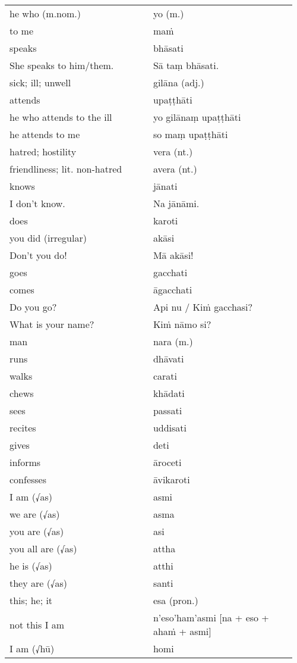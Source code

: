 \documentclass[a5paper]{memoir}
\begin{document}
\begin{longtable}{L{0.48\linewidth} L{0.48\linewidth}}
he who (m.nom.) & yo (m.)\\[0pt]
to me & maṁ\\[0pt]
speaks & bhāsati\\[0pt]
She speaks to him/them. & Sā taṃ bhāsati.\\[0pt]
sick; ill; unwell & gilāna (adj.)\\[0pt]
attends & upaṭṭhāti\\[0pt]
he who attends to the ill & yo gilānaṃ upaṭṭhāti\\[0pt]
he attends to me & so maṃ upaṭṭhāti\\[0pt]
hatred; hostility & vera (nt.)\\[0pt]
friendliness; lit. non-hatred & avera (nt.)\\[0pt]
knows & jānati\\[0pt]
I don't know. & Na jānāmi.\\[0pt]
does & karoti\\[0pt]
you did (irregular) & akāsi\\[0pt]
Don't you do! & Mā akāsi!\\[0pt]
goes & gacchati\\[0pt]
comes & āgacchati\\[0pt]
Do you go? & Api nu / Kiṁ gacchasi?\\[0pt]
What is your name? & Kiṁ nāmo si?\\[0pt]
man & nara (m.)\\[0pt]
runs & dhāvati\\[0pt]
walks & carati\\[0pt]
chews & khādati\\[0pt]
sees & passati\\[0pt]
recites & uddisati\\[0pt]
gives & deti\\[0pt]
informs & āroceti\\[0pt]
confesses & āvikaroti\\[0pt]
I am (√as) & asmi\\[0pt]
we are (√as) & asma\\[0pt]
you are (√as) & asi\\[0pt]
you all are (√as) & attha\\[0pt]
he is (√as) & atthi\\[0pt]
they are (√as) & santi\\[0pt]
this; he; it & esa (pron.)\\[0pt]
not this I am & n'eso'ham'asmi [na + eso + ahaṁ + asmi]\\[0pt]
I am (√hū) & homi\\[0pt]

\end{longtable}
\end{document}
